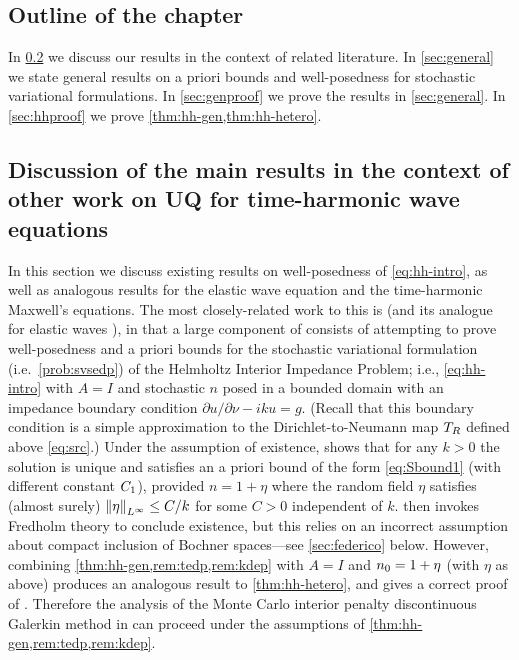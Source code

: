 \subsection{Outline of the chapter} In \cref{sec:otherwork} we discuss our results in the context of related literature. In \cref{sec:general} we  state general results on a priori bounds and well-posedness for stochastic variational formulations. In \cref{sec:genproof} we prove the results in \cref{sec:general}. In \cref{sec:hhproof} we prove \cref{thm:hh-gen,thm:hh-hetero}.%


\subsection{Discussion of the main results in the context of other work on UQ for time-harmonic wave equations}\label{sec:otherwork}

In this section we discuss existing results on well-posedness of \eqref{eq:hh-intro}, as well as analogous results for the elastic wave equation and the time-harmonic Maxwell's equations. The most closely-related work to this  is \cite{FeLiLo:15} (and its analogue for elastic waves \cite{FeLo:17}), in that a large component of \cite{FeLiLo:15} consists of attempting to prove well-posedness and a priori bounds for the stochastic variational formulation (i.e.~\cref{prob:svsedp}) of the Helmholtz Interior Impedance Problem; i.e., \eqref{eq:hh-intro} with $A=I$ and stochastic $n$ posed in a bounded domain with an impedance boundary condition $\partial u/\partial \nu - ik u = g$. (Recall that this boundary condition is a simple approximation to the Dirichlet-to-Neumann map $T_{R}$ defined above \eqref{eq:src}.) Under the assumption of existence, \cite{FeLiLo:15} shows that for any $k>0$ the solution is unique and satisfies an a priori bound of the form \eqref{eq:Sbound1} (with different constant $C_{1}$), provided $n=1+\eta$ where the random field $\eta$ satisfies (almost surely) $\N{\eta}_{L^\infty} \leq C/k$ for some $C>0$ independent of $k$. \cite{FeLiLo:15} then invokes Fredholm theory to conclude existence, but this relies on an incorrect assumption about compact inclusion of Bochner spaces---see \cref{sec:federico} below. However, combining \cref{thm:hh-gen,rem:tedp,rem:kdep} with $A=I$ and $n_{0}=1+\eta$ (with $\eta$ as above) produces an analogous result to \cref{thm:hh-hetero}, and gives a correct proof of \cite[Theorem 2.5]{FeLiLo:15}. Therefore the analysis of the Monte Carlo interior penalty discontinuous Galerkin method in \cite{FeLiLo:15} can proceed under the assumptions of \cref{thm:hh-gen,rem:tedp,rem:kdep}.

